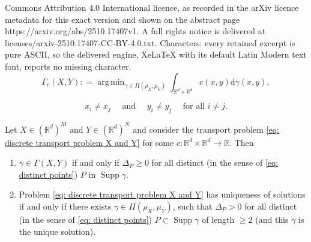 \documentclass[10pt,a4paper]{amsart}
\DeclareMathOperator*{\argmin}{arg\,\min}
\DeclareMathOperator{\supp}{Supp}
\newcommand{\R}{\mathbb{R}}
\newcommand{\di}{\mathrm{d}}
\begin{document}
Commons Attribution 4.0 International licence, as recorded in the arXiv licence metadata for this exact version and shown on the abstract page https://arxiv.org/abs/2510.17407v1. A full rights notice is delivered at licenses/arxiv-2510.17407-CC-BY-4.0.txt. Characters: every retained excerpt is pure ASCII, so the delivered engine, XeLaTeX with its default Latin Modern text font, reports no missing character.
\begin{equation}
\label{eq: discrete transport problem X and Y}
    \Gamma_c(X, Y) : = \argmin_{\gamma \in \Pi(\rho_X, \mu_Y)} \int_{\R^d \times \R^d} c(x, y) \di \gamma(x, y),
\end{equation}

\begin{equation}
\label{eq: distinct points}
  x_i \neq x_j \quad\text{ and }\quad y_i \neq y_j \quad \text{ for all } i \neq j.  
\end{equation}

\begin{proposition}
\label{prop: uniqueness iff strict cm}
    Let $X \in (\R^d)^M$ and $Y \in (\R^d)^N$ and consider the transport problem \eqref{eq: discrete transport problem X and Y} for some $c: \R^d \times \R^d \to \R$. Then
    \begin{enumerate}[label=(\roman*)]
        \item \label{enum: weak inequality} $\gamma \in \Gamma(X, Y)$ if and only if $\Delta_P \geq 0$ for all distinct (in the sense of \eqref{eq: distinct points}) $P$ in $\supp \gamma$.
        \item \label{enum: strict gives uniqueness} Problem \eqref{eq: discrete transport problem X and Y} has uniqueness of solutions if and only if there exists $\gamma \in \Pi(\rho_X, \mu_Y)$, such that $\Delta_P > 0$ for all distinct (in the sense of \eqref{eq: distinct points}) $P \subset \supp \gamma$ of length $\geq 2$ (and this $\gamma$ is the unique solution).
    \end{enumerate}
\end{proposition}
\end{document}
